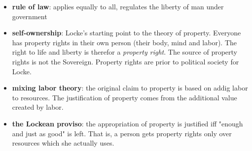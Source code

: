 \begin{itemize}
	\item \textbf{rule of law}: applies equally to all, regulates the
	 liberty of man under government
	\item \textbf{self-ownership}: Locke's starting point to the theory of
	 property. Everyone has property rights in their own person (their
	 body, mind and labor). The right to life and liberty is therefor a
	 \textit{property right}. The source of property rights is not the
	 Sovereign. Property rights are prior to political society for Locke.
	\item \textbf{mixing labor theory}: the original claim to property is
	 based on addig labor to resources. The justification of property
	 comes from the additional value created by labor.
	\item \textbf{the Lockean proviso}: the appropriation of property is
	 justified iff "enough and just as good" is left. That is, a person
	 gets property rights only over resources which she actually uses.
\end{itemize}
